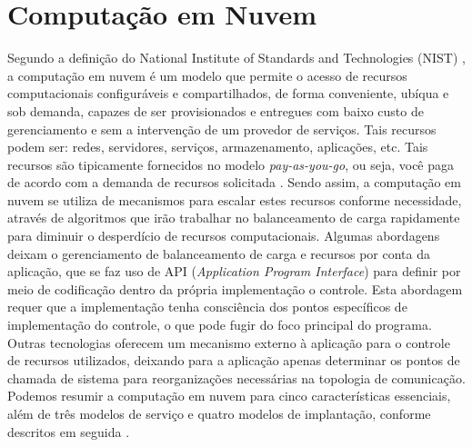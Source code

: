 \documentclass[twoside,english,brazilian]{UNISINOSartigo}
\begin{document}
\section{Computação em Nuvem}
\label{cloud}
Segundo a definição do National Institute of Standards and Technologies (NIST) \cite{Mell2012}, a computação em nuvem é um modelo que permite o acesso de recursos computacionais configuráveis e compartilhados, de forma conveniente, ubíqua e sob demanda, capazes de ser provisionados e entregues com baixo custo de gerenciamento e sem a intervenção de um provedor de serviços. Tais recursos podem ser: redes, servidores, serviços, armazenamento, aplicações, etc. Tais recursos são tipicamente fornecidos no modelo \textit{pay-as-you-go}, ou seja, você paga de acordo com a demanda de recursos solicitada \cite{Suleiman2012}. Sendo assim, a computação em nuvem se utiliza de mecanismos para escalar estes recursos conforme necessidade, através de algoritmos que irão trabalhar no balanceamento de carga rapidamente para diminuir o desperdício de recursos computacionais.
Algumas abordagens deixam o gerenciamento de balanceamento de carga e recursos por conta da aplicação, que se faz uso de API (\textit{Application Program Interface}) para definir por meio de codificação dentro da própria implementação o controle. Esta abordagem requer que a implementação tenha consciência dos pontos específicos de implementação do controle, o que pode fugir do foco principal do programa. Outras tecnologias oferecem um mecanismo externo à aplicação para o controle de recursos utilizados, deixando para a aplicação apenas determinar os pontos de chamada de sistema para reorganizações necessárias na topologia de comunicação. 
Podemos resumir a computação em nuvem para cinco características essenciais, além de três modelos de serviço e quatro modelos de implantação, conforme descritos em seguida \cite{Verdi2010}.
\end{document}
